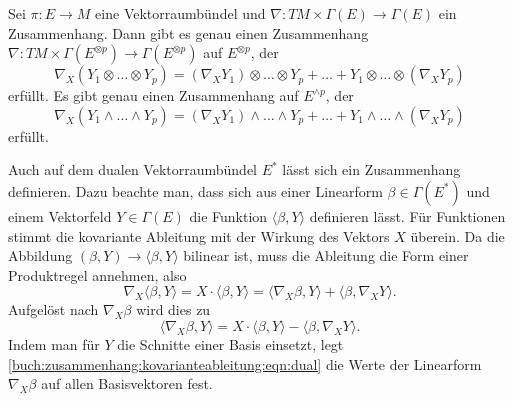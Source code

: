 \begin{satz}
Sei $\pi\colon E\to M$ eine Vektorraumbündel und 
$\nabla \colon TM\times \Gamma(E)\to\Gamma(E)$
ein Zusammenhang.
Dann gibt es genau einen Zusammenhang
$\nabla \colon TM \times \Gamma(E^{\otimes p})\to\Gamma(E^{\otimes p})$
auf $E^{\otimes p}$, der
\[
\nabla_X(Y_1\otimes\dots\otimes Y_p)
=
(\nabla_XY_1) \otimes\dots\otimes Y_p
+
\dots
+
Y_1\otimes\dots\otimes (\nabla_XY_p)
\]
erfüllt.
Es gibt genau einen Zusammenhang auf $E^{\wedge p}$, der
\[
\nabla_X(Y_1\wedge\dots\wedge Y_p)
=
(\nabla_XY_1)\wedge\dots\wedge Y_p
+
\dots
+
Y_1\wedge\dots\wedge(\nabla_XY_p)
\]
erfüllt.
\end{satz}

Auch auf dem dualen Vektorraumbündel $E^*$ lässt sich ein Zusammenhang
definieren.
Dazu beachte man, dass sich aus einer Linearform $\beta\in\Gamma(E^*)$
und einem Vektorfeld $Y\in \Gamma(E)$ die Funktion
$\langle\beta,Y\rangle$ definieren lässt.
Für Funktionen stimmt die kovariante Ableitung mit der Wirkung des
Vektors $X$ überein.
Da die Abbildung $(\beta,Y)\to\langle\beta,Y\rangle$ bilinear ist,
muss die Ableitung die Form einer Produktregel annehmen, also
\[
\nabla_X\langle \beta,Y\rangle
=
X\cdot \langle \beta,Y\rangle
=
\langle \nabla_X\beta,Y\rangle
+
\langle \beta,\nabla_X Y\rangle.
\]
Aufgelöst nach $\nabla_X\beta$ wird dies zu
\begin{equation}
\langle \nabla_X\beta,Y\rangle
=
X\cdot \langle \beta,Y\rangle
-
\langle \beta,\nabla_X Y\rangle.
\label{buch:zusammenhang:kovarianteableitung:eqn:dual}
\end{equation}
Indem man für $Y$ die Schnitte einer Basis einsetzt, 
legt
\eqref{buch:zusammenhang:kovarianteableitung:eqn:dual}
die Werte der Linearform $\nabla_X\beta$ auf allen Basisvektoren
fest.

